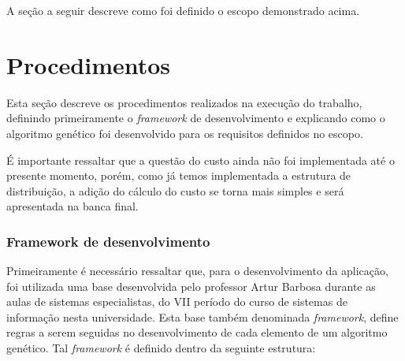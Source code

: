 \par A seção a seguir descreve como foi definido o escopo demonstrado acima.



\section{Procedimentos}

\par Esta seção descreve os procedimentos realizados na execução do trabalho,
definindo primeiramente o \textit{framework} de desenvolvimento e explicando
como o algoritmo genético foi desenvolvido para os requisitos definidos no escopo.

\par É importante ressaltar que a questão do custo ainda não foi implementada
até o presente momento, porém, como já temos implementada a estrutura de
distribuição, a adição do cálculo do custo se torna mais simples e será
apresentada na banca final.

\subsubsection{Framework de desenvolvimento}
\par Primeiramente é necessário ressaltar que, para o desenvolvimento da aplicação, foi utilizada uma base desenvolvida pelo professor Artur Barbosa durante as aulas de sistemas especialistas, do VII período do curso de sistemas de informação nesta universidade.
Esta base também denominada \textit{framework}, define regras a serem seguidas no desenvolvimento de cada elemento
de um algoritmo genético. Tal \textit{framework} é definido dentro da seguinte estrutura:

